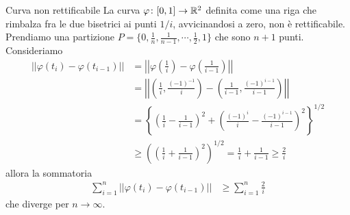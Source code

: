 \documentclass[a4paper]{article}
\begin{document}
\begin{radioactive}
\begin{snippetexample}{Curva non rettificabile}
    La curva \(\varphi\colon [0,1] \to \mathbb{R}^2\)
    definita come una riga che rimbalza fra le due bisetrici ai punti \(1/i\), avvicinandosi a zero, non è rettificabile.
    Prendiamo una partizione \(P = \{0, \frac{1}{n}, \frac{1}{n-1}, \cdots, \frac{1}{2}, 1\}\) che sono \(n+1\) punti.
    Consideriamo
    \begin{align*}
        ||\varphi(t_i) - \varphi(t_{i-1})||
        &= \left|\left|\varphi\left(\frac{1}{i}\right)-\varphi\left(\frac{1}{i-1}\right)\right|\right| \\
        &= \left|\left|\left(\frac{1}{i}, \frac{{(-1)}^{-1}}{i}\right)
        - \left(\frac{1}{i-1}, \frac{{(-1)}^{i-1}}{i-1}\right)\right|\right| \\
        &= {\left\{
            {\left(\frac{1}{i} - \frac{1}{i-1}\right)}^2 +
            {\left(\frac{{(-1)}^i}{i} - \frac{{(-1)}^{i-1}}{i-1}\right)}^2
        \right\}}^{1/2} \\
        &\geq {\left({\left(\frac{1}{i} + \frac{1}{i-1}\right)}^2\right)}^{1/2}
        = \frac{1}{i} + \frac{1}{i-1} \geq \frac{2}{i}
    \end{align*}
    allora la sommatoria
    \begin{align*}
        \sum_{i=1}^n ||\varphi(t_i) - \varphi(t_{i-1})||
        &\geq \sum_{i=1}^n \frac{2}{i}
    \end{align*}
    che diverge per \(n \to \infty\).
\end{snippetexample}
\end{radioactive}

\begin{center}
  \end{center}
\end{document}
